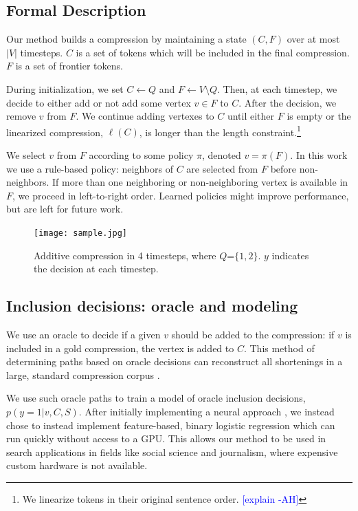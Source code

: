 \documentclass[11pt,a4paper]{article}
\newcommand{\ahcomment}[1]{\textcolor{blue}{[#1 -AH]}}
\begin{document}
\subsection{Formal Description}\label{s:formal}

Our method builds a compression by maintaining a state
$(C,F)$ over at most $|V|$ timesteps. $C$ is a set of tokens which will be included in the final compression. $F$ is a set of frontier tokens.

During initialization, we set $C \gets Q$ and $F \gets V \setminus Q$. Then, at each timestep, we decide to either add or not add some vertex $v \in F$ to $C$. After the decision, we remove $v$ from $F$. We continue adding vertexes to $C$ until either $F$ is empty or the linearized compression, $\ell(C)$, is longer than the length constraint.\footnote{We linearize tokens in their original sentence order. \ahcomment{explain}}

We select $v$ from $F$ according to some policy $\pi$, denoted $v = \pi(F)$. In this work we use a rule-based policy: neighbors of $C$ are selected from $F$ before non-neighbors. If more than one neighboring or non-neighboring vertex is available in $F$, we proceed in left-to-right order. Learned policies \cite{sutton2018reinforcement} might improve performance, but are left for future work. 

\begin{figure}[h]
\texttt{[image: sample.jpg]}
\caption{Additive compression in 4 timesteps, where $Q$=$\{1,2\}$. $y$ indicates the decision at each timestep.}
\end{figure}


\subsection{Inclusion decisions: oracle and modeling}\label{s:modeling}

We use an oracle to decide if a given $v$ should be added to the compression: if $v$ is included in a gold compression, the vertex is added to $C$. This method of determining paths based on oracle decisions can reconstruct all shortenings in a large, standard compression corpus \cite{filippova2013overcoming}.

We use such oracle paths to train a model of oracle inclusion decisions, $p(y  = 1 | v, C, S)$. After initially implementing a neural approach \cite{D14-1082}, we instead chose to instead implement feature-based, binary logistic regression which can run quickly without access to a GPU. This allows our method to be used in search applications in fields like social science and journalism, where expensive custom hardware is not available. 
\end{document}
